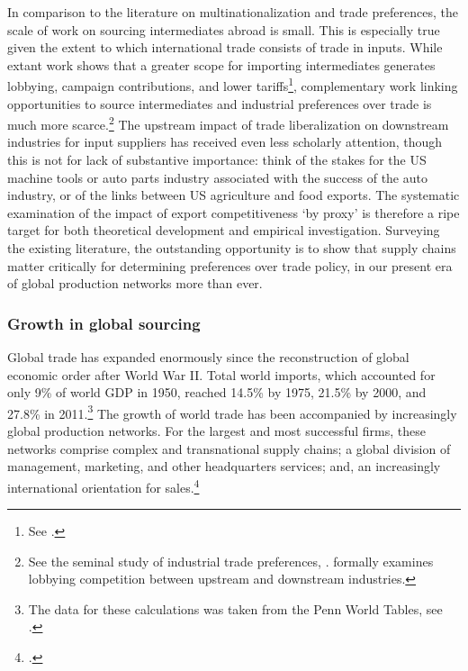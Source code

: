 \documentclass[hidelinks,12pt,letter]{article}
\begin{document}
In comparison to the literature on multinationalization and trade preferences, the scale of work on sourcing intermediates abroad is small. This is especially true given the extent to which international trade consists of trade in inputs. While extant work shows that a greater scope for importing intermediates generates lobbying, campaign contributions, and lower tariffs\footnote{See \citealt{gawande2012lobbying,mccalman2004protection, gawande2000protection}.}, complementary work linking opportunities to source intermediates and industrial preferences over trade is much more scarce.\footnote{See the seminal study of industrial trade preferences, \citealt{schattschneider1935politics}. \citealt{acharya2015trade} formally examines lobbying competition between upstream and downstream industries.} The upstream impact of trade liberalization on downstream industries for input suppliers has received even less scholarly attention, though this is not for lack of substantive importance: think of the stakes for the US machine tools or auto parts industry associated with the success of the auto industry, or of the links between US agriculture and food exports. The systematic examination of the impact of export competitiveness `by proxy' is therefore a ripe target for both theoretical development and empirical investigation. Surveying the existing literature, the outstanding opportunity is to show that supply chains matter critically for determining preferences over trade policy, in our present era of global production networks more than ever. %

\subsubsection*{Growth in global sourcing}
Global trade has expanded enormously since the reconstruction of global economic order after World War II. Total world imports, which accounted for only 9\% of world GDP in 1950, reached 14.5\% by 1975, 21.5\% by 2000, and 27.8\% in 2011.\footnote{The data for these calculations was taken from the Penn World Tables, see \citealt{feenstra2015next}.} The growth of world trade has been accompanied by increasingly global production networks. For the largest and most successful firms, these networks comprise complex and transnational supply chains; a global division of management, marketing, and other headquarters services; and, an increasingly international orientation for sales.\footnote{\citealt{henderson2002global, unctad1999foreign}.} 
\end{document}
